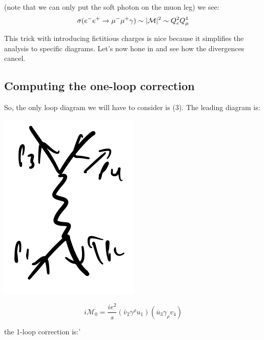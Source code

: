 (note that we can only put the soft photon on the muon leg) we see:
\begin{equation}
    \sigma(e^-e^+ \to \mu^-\mu^+\gamma) \sim \lvert \mathcal{M} \rvert^2 \sim Q_e^2Q_\mu^4
\end{equation}

This trick with introducing fictitious charges is nice because it simplifies the analysis to specific diagrams. Let's now hone in and see how the divergences cancel.

\subsection{Computing the one-loop correction}
So, the only loop diagram we will have to consider is (3). The leading diagram is:

\begin{center}
    \includegraphics[scale=0.35]{Lectures/Images/lec14-treemomenta.png}
\end{center}

\begin{equation}
    i\mathcal{M}_0 = \frac{ie^2}{s}(\bar{v}_2\gamma^\rho u_1)(\bar{u}_3\gamma_\rho v_4)
\end{equation}

the 1-loop correction is:'

